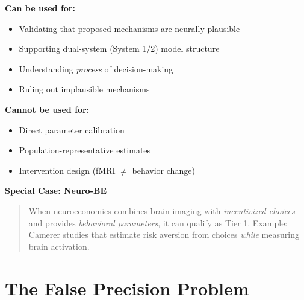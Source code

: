 \documentclass[11pt, a4paper]{article}
\begin{document}
\begin{tcolorbox}[colback=purple!5!white, colframe=purple!75!black,
    title=Tier 5: Neural Evidence]

\textbf{Can be used for:}
\begin{itemize}[nosep]
    \item Validating that proposed mechanisms are neurally plausible
    \item Supporting dual-system (System 1/2) model structure
    \item Understanding \textit{process} of decision-making
    \item Ruling out implausible mechanisms
\end{itemize}

\textbf{Cannot be used for:}
\begin{itemize}[nosep]
    \item Direct parameter calibration
    \item Population-representative estimates
    \item Intervention design (fMRI $\neq$ behavior change)
\end{itemize}

\textbf{Special Case: Neuro-BE}
\begin{quote}
When neuroeconomics combines brain imaging with \textit{incentivized choices} and provides \textit{behavioral parameters}, it can qualify as Tier 1. Example: Camerer studies that estimate risk aversion from choices \textit{while} measuring brain activation.
\end{quote}

\end{tcolorbox}


\section{The False Precision Problem}
\label{sec:evd-false-precision}
\end{document}
